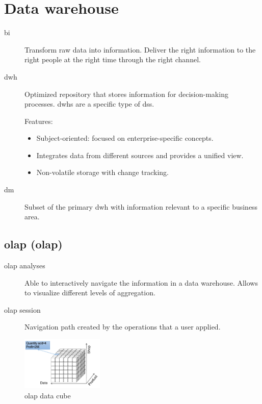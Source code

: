 \chapter{Data warehouse}


\begin{description}
    \item[\Acl{bi}] 
        Transform raw data into information.
        Deliver the right information to the right people at the right time through the right channel.

    \item[\Ac{dwh}] 
        Optimized repository that stores information for decision-making processes.
        \Acp{dwh} are a specific type of \ac{dss}.

        Features:
        \begin{itemize}
            \item Subject-oriented: focused on enterprise-specific concepts.
            \item Integrates data from different sources and provides a unified view.
            \item Non-volatile storage with change tracking. 
        \end{itemize}

    \item[\Ac{dm}] 
        Subset of the primary \ac{dwh} with information relevant to a specific business area.
\end{description}



\section{\Acl{olap} (\Acs{olap})}

\begin{description}
    \item[\ac{olap} analyses] 
        Able to interactively navigate the information in a data warehouse.
        Allows to visualize different levels of aggregation.

    \item[\ac{olap} session] 
        Navigation path created by the operations that a user applied.
\end{description}

\begin{figure}[H]
    \centering
    \includegraphics[width=0.35\textwidth]{img/_olap_cube.pdf}
    \caption{\ac{olap} data cube}
\end{figure}


